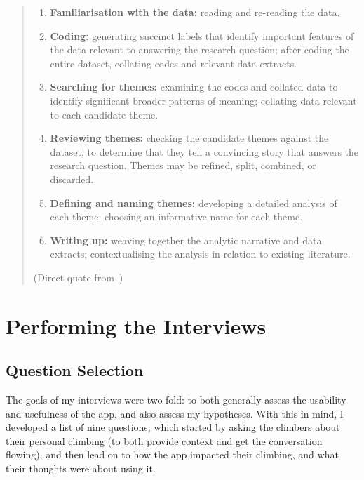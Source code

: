 \begin{quote}
\begin{enumerate}
    \item \textbf{Familiarisation with the data:} reading and re-reading the data.
    \item \textbf{Coding:} generating succinct labels that identify important features of the data relevant to answering the research question; after coding the entire dataset, collating codes and relevant data extracts.
    \item \textbf{Searching for themes:} examining the codes and collated data to identify significant broader patterns of meaning; collating data relevant to each candidate theme.
    \item \textbf{Reviewing themes:} checking the candidate themes against the dataset, to determine that they tell a convincing story that answers the research question. Themes may be refined, split, combined, or discarded.
    \item \textbf{Defining and naming themes:} developing a detailed analysis of each theme; choosing an informative name for each theme.
    \item \textbf{Writing up:} weaving together the analytic narrative and data extracts; contextualising the analysis in relation to existing literature.
\end{enumerate}

\hspace*{\fill}(Direct quote from~\cite{brauminterviewta})
\end{quote}

\section{Performing the Interviews}
\subsection{Question Selection}
The goals of my interviews were two-fold: to both generally assess the usability and usefulness of the app, and also assess my hypotheses.
With this in mind, I developed a list of nine questions, which started by asking the climbers about their personal climbing (to both provide context and get the conversation flowing), and then lead on to how the app impacted their climbing, and what their thoughts were about using it.

